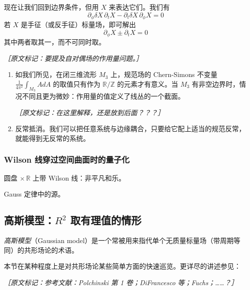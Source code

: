 现在让我们回到边界条件，但用 $X$ 来表达它们。我们有
\begin{equation}
  \partial_\phi\delta X\,\partial_tX-\partial_t\delta X\,\partial_\phi X=0
  \tag{2.305}
  \label{eq:2.305}
\end{equation}
若 $X$ 是手征（或反手征）标量场，即可解出
\begin{equation}
  \partial_\phi X\pm\partial_t X=0
  \tag{2.306}
  \label{eq:2.306}
\end{equation}
其中两者取其一，而不可同时取。

{\small\itshape ［原文标记：要提及自对偶场的作用量问题。］}

\begin{enumerate}
  \item 如我们所见，在闭三维流形 $M_3$ 上，规范场的 Chern-Simons 不变量 $\frac{1}{4\pi^2}\int_{M_3}AdA$ 的取值只有作为 $\mathbb{R}/\mathbb{Z}$ 的元素才有意义。当 $M_3$ 有非空边界时，情况不同且更为微妙：作用量的值定义了线丛的一个截面。

  {\small\itshape ［原文标记：在这里解释，还是放到后面？？？］}

  \item 反常抵消。我们可以把任意系统与边缘耦合，只要给它配上适当的规范反常，就能得到无反常的系统。
\end{enumerate}

\subsubsection{Wilson 线穿过空间曲面时的量子化} %

圆盘 $\times\,\mathbb{R}$ 上带 Wilson 线：非平凡和乐。

Gauss 定律中的源。

\subsection{高斯模型：$R^2$ 取有理值的情形} %

\emph{高斯模型}（Gaussian model）是一个常被用来指代单个无质量标量场（带周期等同）的共形场论的术语。

本节在某种程度上是对共形场论某些简单方面的快速巡览。更详尽的讲述参见：

{\small\itshape ［原文标记：参考文献：Polchinski 第 1 卷；DiFrancesco 等；Fuchs；……？］}


